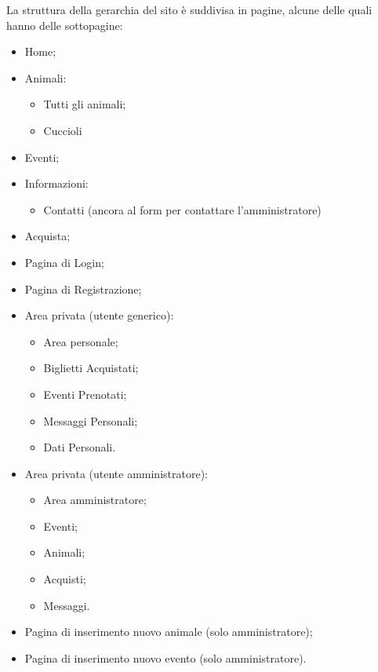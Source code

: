     La struttura della gerarchia del sito è suddivisa in pagine, alcune delle quali hanno delle sottopagine:
    \begin{itemize}
        \item Home;
        \item Animali:
            \begin{itemize}
                \item Tutti gli animali;
                \item Cuccioli
            \end{itemize}
        \item Eventi;
        \item Informazioni:
            \begin{itemize}
                \item Contatti (ancora al form per contattare l'amministratore)
            \end{itemize}
        \item Acquista;
        \item Pagina di Login;
        \item Pagina di Registrazione;
        \item Area privata (utente generico):
            \begin{itemize}
                \item Area personale;
                \item Biglietti Acquistati;
                \item Eventi Prenotati;
                \item Messaggi Personali;
                \item Dati Personali.
            \end{itemize}
            \item Area privata (utente amministratore):
                \begin{itemize}
                    \item Area amministratore;
                    \item Eventi;
                    \item Animali;
                    \item Acquisti;
                    \item Messaggi.
                \end{itemize}
            \item Pagina di inserimento nuovo animale (solo amministratore);
            \item Pagina di inserimento nuovo evento (solo amministratore).
    \end{itemize}

